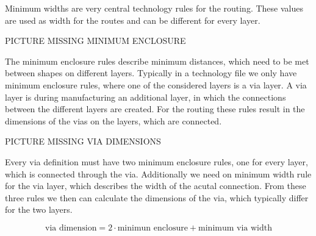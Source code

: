 Minimum widths are very central technology rules for the routing. These values are used as width for the routes and can be different for every layer.

PICTURE MISSING MINIMUM ENCLOSURE

The minimum enclosure rules describe minimum distances, which need to be met between shapes on different layers. Typically in a technology file we only have minimum enclosure rules, where one of the considered layers is a via layer. A via layer is during manufacturing an additional layer, in which the connections between the different layers are created. For the routing these rules result in the dimensions of the vias on the layers, which are connected.

PICTURE MISSING VIA DIMENSIONS

Every via definition must have two minimum enclosure rules, one for every layer, which is connected through the via. Additionally we need on minimum width rule for the via layer, which describes the width of the acutal connection. From these three rules we then can calculate the dimensions of the via, which typically differ for the two layers.

\[\text{via dimension} = 2 \cdot \text{minimun enclosure} + \text{minimum via width}\]